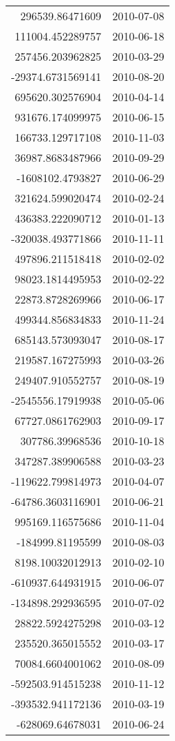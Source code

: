 \begin{tabular}{r | l}
296539.86471609 & 2010-07-08 \\
111004.452289757 & 2010-06-18 \\
257456.203962825 & 2010-03-29 \\
-29374.6731569141 & 2010-08-20 \\
695620.302576904 & 2010-04-14 \\
931676.174099975 & 2010-06-15 \\
166733.129717108 & 2010-11-03 \\
36987.8683487966 & 2010-09-29 \\
-1608102.4793827 & 2010-06-29 \\
321624.599020474 & 2010-02-24 \\
436383.222090712 & 2010-01-13 \\
-320038.493771866 & 2010-11-11 \\
497896.211518418 & 2010-02-02 \\
98023.1814495953 & 2010-02-22 \\
22873.8728269966 & 2010-06-17 \\
499344.856834833 & 2010-11-24 \\
685143.573093047 & 2010-08-17 \\
219587.167275993 & 2010-03-26 \\
249407.910552757 & 2010-08-19 \\
-2545556.17919938 & 2010-05-06 \\
67727.0861762903 & 2010-09-17 \\
307786.39968536 & 2010-10-18 \\
347287.389906588 & 2010-03-23 \\
-119622.799814973 & 2010-04-07 \\
-64786.3603116901 & 2010-06-21 \\
995169.116575686 & 2010-11-04 \\
-184999.81195599 & 2010-08-03 \\
8198.10032012913 & 2010-02-10 \\
-610937.644931915 & 2010-06-07 \\
-134898.292936595 & 2010-07-02 \\
28822.5924275298 & 2010-03-12 \\
235520.365015552 & 2010-03-17 \\
70084.6604001062 & 2010-08-09 \\
-592503.914515238 & 2010-11-12 \\
-393532.941172136 & 2010-03-19 \\
-628069.64678031 & 2010-06-24 \\

\end{tabular}
